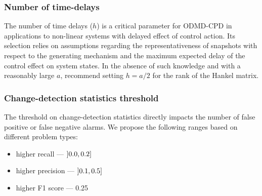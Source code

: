 \subsubsection{Number of time-delays}
The number of time delays (\(h\)) is a critical parameter for ODMD-CPD in applications to non-linear systems with delayed effect of control action. Its selection relies on assumptions regarding the representativeness of snapshots with respect to the generating mechanism and the maximum expected delay of the control effect on system states. In the absence of such knowledge and with a reasonably large \(a\), \citet{Moskvina2003} recommend setting \(h = a / 2\) for the rank of the Hankel matrix.

\subsubsection{Change-detection statistics threshold}
The threshold on change-detection statistics directly impacts the number of false positive or false negative alarms. We propose the following ranges based on different problem types:
\begin{itemize}
    \item higher recall --- \( \interval[open left]{0.0}{0.2} \)
    \item higher precision --- \( \interval[open left]{0.1}{0.5} \)
    \item higher F1 score --- 0.25
\end{itemize}
